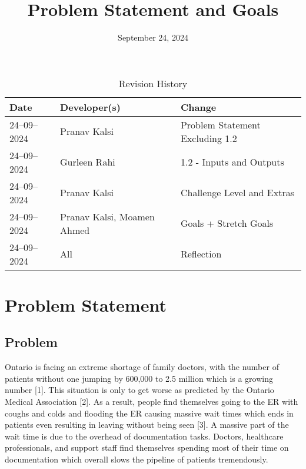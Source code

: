 \documentclass{article}
\title{Problem Statement and Goals\\\progname}
\author{\authname}
\date{September 24, 2024}
\begin{document}
\maketitle

\begin{table}[hp]
\caption{Revision History} \label{TblRevisionHistory}
\begin{tabularx}{\textwidth}{llX}
\toprule
\textbf{Date} & \textbf{Developer(s)} & \textbf{Change}\\
\midrule
24--09--2024 & Pranav Kalsi & Problem Statement Excluding 1.2\\
24--09--2024 & Gurleen Rahi & 1.2 - Inputs and Outputs\\
24--09--2024 & Pranav Kalsi & Challenge Level and Extras\\
24--09--2024 & Pranav Kalsi, Moamen Ahmed & Goals + Stretch Goals\\
24--09--2024 & All & Reflection\\
\bottomrule
\end{tabularx}
\end{table}

\section{Problem Statement}

\subsection{Problem}

Ontario is facing an extreme shortage of family doctors, with the number of patients without one jumping by 600,000 to 2.5 million which is a growing number [1]. This situation is only to get worse as predicted by the Ontario Medical Association [2]. As a result, people find themselves going to the ER with coughs and colds and flooding the ER causing massive wait times which ends in patients even resulting in leaving without being seen [3]. A massive part of the wait time is due to the overhead of documentation tasks. Doctors, healthcare professionals, and support staff find themselves spending most of their time on documentation which overall slows the pipeline of patients tremendously.
\end{document}
